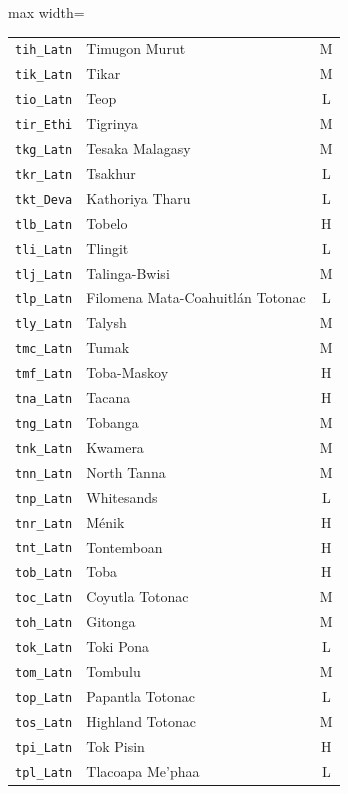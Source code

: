 {\begin{adjustbox}{max width=\textwidth}
\begin{tabular}{llc}
        \texttt{tih\_Latn} & Timugon Murut & M \\
        \texttt{tik\_Latn} & Tikar & M \\
        \texttt{tio\_Latn} & Teop & L \\
        \texttt{tir\_Ethi} & Tigrinya & M \\
        \texttt{tkg\_Latn} & Tesaka Malagasy & M \\
        \texttt{tkr\_Latn} & Tsakhur & L \\
        \texttt{tkt\_Deva} & Kathoriya Tharu & L \\
        \texttt{tlb\_Latn} & Tobelo & H \\
        \texttt{tli\_Latn} & Tlingit & L \\
        \texttt{tlj\_Latn} & Talinga-Bwisi & M \\
        \texttt{tlp\_Latn} & Filomena Mata-Coahuitlán Totonac & L \\
        \texttt{tly\_Latn} & Talysh & M \\
        \texttt{tmc\_Latn} & Tumak & M \\
        \texttt{tmf\_Latn} & Toba-Maskoy & H \\
        \texttt{tna\_Latn} & Tacana & H \\
        \texttt{tng\_Latn} & Tobanga & M \\
        \texttt{tnk\_Latn} & Kwamera & M \\
        \texttt{tnn\_Latn} & North Tanna & M \\
        \texttt{tnp\_Latn} & Whitesands & L \\
        \texttt{tnr\_Latn} & Ménik & H \\
        \texttt{tnt\_Latn} & Tontemboan & H \\
        \texttt{tob\_Latn} & Toba & H \\
        \texttt{toc\_Latn} & Coyutla Totonac & M \\
        \texttt{toh\_Latn} & Gitonga & M \\
        \texttt{tok\_Latn} & Toki Pona & L \\
        \texttt{tom\_Latn} & Tombulu & M \\
        \texttt{top\_Latn} & Papantla Totonac & L \\
        \texttt{tos\_Latn} & Highland Totonac & M \\
        \texttt{tpi\_Latn} & Tok Pisin & H \\
        \texttt{tpl\_Latn} & Tlacoapa Me'phaa & L \\

\end{tabular}
\end{adjustbox}}
